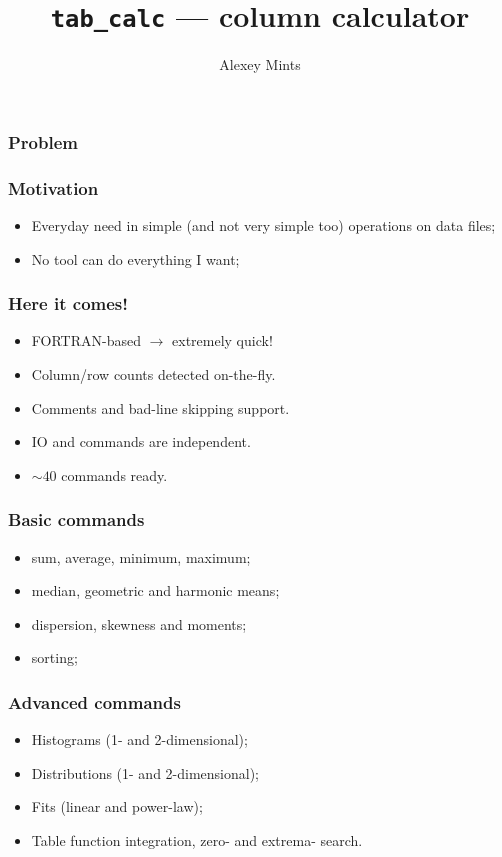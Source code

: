 \documentclass[14pt]{beamer}
\author{Alexey Mints}
\title{\texttt{tab\_calc} --- column calculator}
\begin{document}
\maketitle

\begin{frame}
 \frametitle{Problem}
 \begin{tiny} \end{tiny}
\end{frame}

\begin{frame}
 \frametitle{Motivation}
\begin{itemize}
 \item Everyday need in simple (and not very simple too) operations on data files;
 \item No tool can do everything I want;
\end{itemize}
\end{frame}

\begin{frame}
 \frametitle{Here it comes!}
\begin{itemize}
 \item FORTRAN-based $\xrightarrow{}$ extremely quick!
 \item Column/row counts detected on-the-fly.
 \item Comments and bad-line skipping support.
 \item IO and commands are independent.
 \item $\sim40$ commands ready.
\end{itemize}

\end{frame}

\begin{frame}
 \frametitle{Basic commands}
\begin{itemize}
 \item sum, average, minimum, maximum;
 \item median, geometric and harmonic means;
 \item dispersion, skewness and moments;
 \item sorting;
\end{itemize}
\end{frame}

\begin{frame}
 \frametitle{Advanced commands}
\begin{itemize}
 \item Histograms (1- and 2-dimensional);
 \item Distributions (1- and 2-dimensional);
 \item Fits (linear and power-law);
 \item Table function integration, zero- and extrema- search.
\end{itemize}
\end{frame}
\end{document}
